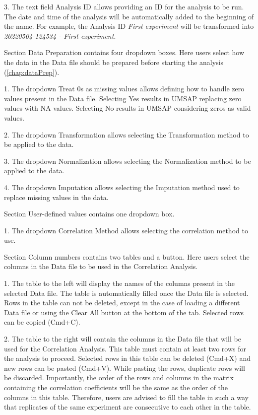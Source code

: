 \num{3}. The text field Analysis ID allows providing an ID for the analysis
to be run. The date and time of the analysis will be automatically added to the
beginning of the name. For example, the Analysis ID \textit{First experiment} will
be transformed into \textit{20220504-124534 - First experiment}.

Section Data Preparation contains four dropdown boxes. Here users select how the data
in the Data file should be prepared before starting the analysis (\autoref{chap:dataPrep}).

\num{1}. The dropdown Treat \num{0}s as missing values allows defining how
to handle zero values present in the Data file. Selecting Yes results in UMSAP
replacing zero values with NA values. Selecting No results in UMSAP considering
zeros as valid values.

\num{2}. The dropdown Transformation allows selecting the Transformation method
to be applied to the data.

\num{3}. The dropdown Normalization allows selecting the Normalization method
to be applied to the data.

\num{4}. The dropdown Imputation allows selecting the Imputation method used
to replace missing values in the data.

Section User-defined values contains one dropdown box.

\num{1}. The dropdown Correlation Method allows selecting the correlation method
to use.

Section Column numbers contains two tables and a button. Here users select the columns
in the Data file to be used in the Correlation Analysis.

\num{1}. The table to the left will display the names of the columns present in the
selected Data file. The table is automatically filled once the Data file is selected.
Rows in the table can not be deleted, except in the case of loading a different Data
file or using the Clear All button at the bottom of the tab. Selected rows can be
copied (Cmd+C).

\num{2}. The table to the right will contain the columns in the Data file that will
be used for the Correlation Analysis. This table must contain at least two rows for
the analysis to proceed. Selected rows in this table can be deleted (Cmd+X)
and new rows can be pasted (Cmd+V). While pasting the rows, duplicate rows will be
discarded.
Importantly, the order of the rows and columns in the matrix containing the correlation
coefficients will be the same as the order of the columns in this table. Therefore,
users are advised to fill the table in such a way that replicates of the same experiment
are consecutive to each other in the table.

